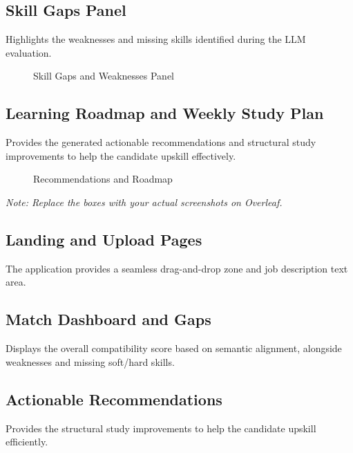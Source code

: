 \documentclass[12pt,a4paper]{article}
\begin{document}
\subsection{Skill Gaps Panel}
Highlights the weaknesses and missing skills identified during the LLM evaluation.
\begin{figure}[H]
    \centering
    \fbox{\rule{0pt}{2in} \rule{0.8\textwidth}{0pt}}
    \caption{Skill Gaps and Weaknesses Panel}
    \label{fig:gaps}
\end{figure}

\subsection{Learning Roadmap and Weekly Study Plan}
Provides the generated actionable recommendations and structural study improvements to help the candidate upskill effectively.
\begin{figure}[H]
    \centering
    \fbox{\rule{0pt}{2in} \rule{0.8\textwidth}{0pt}}
    \caption{Recommendations and Roadmap}
\end{figure}
\textit{Note: Replace the boxes with your actual screenshots on Overleaf.}

\subsection{Landing and Upload Pages}
The application provides a seamless drag-and-drop zone and job description text area.
\begin{center}
    \fbox{\rule{0pt}{0.6in} \rule{0.8\linewidth}{0pt}}
\end{center}

\subsection{Match Dashboard and Gaps}
Displays the overall compatibility score based on semantic alignment, alongside weaknesses and missing soft/hard skills.
\begin{center}
    \fbox{\rule{0pt}{0.6in} \rule{0.8\linewidth}{0pt}}
\end{center}

\subsection{Actionable Recommendations}
Provides the structural study improvements to help the candidate upskill efficiently.
\begin{center}
    \fbox{\rule{0pt}{0.6in} \rule{0.8\linewidth}{0pt}}
\end{center}
\end{document}

